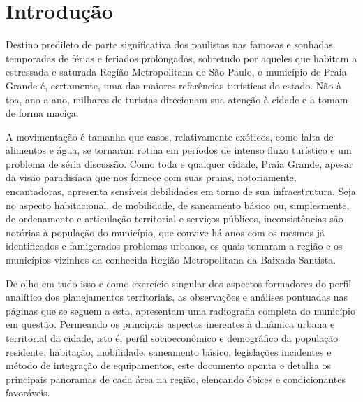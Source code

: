 	\tableofcontents 
	\newpage \listoffigures
	\newpage \listoftables
	\textual


%
%

%
%
	
	\chapter{Introdução}
	
	Destino predileto de parte significativa dos paulistas nas famosas e sonhadas temporadas de férias e feriados prolongados, sobretudo por aqueles que habitam a estressada e saturada Região Metropolitana de São Paulo, o município de Praia Grande é, certamente, uma das maiores referências turísticas do estado. Não à toa, ano a ano, milhares de turistas direcionam sua atenção à cidade e a tomam de forma maciça.
	
	A movimentação é tamanha que casos, relativamente exóticos, como falta de alimentos e água, se tornaram rotina em períodos de intenso fluxo turístico e um problema de séria discussão. Como toda e qualquer cidade, Praia Grande, apesar da visão paradisíaca que nos fornece com suas praias, notoriamente, encantadoras, apresenta sensíveis debilidades em torno de sua infraestrutura. Seja no aspecto habitacional, de mobilidade, de saneamento básico ou, simplesmente, de ordenamento e articulação territorial e serviços públicos, inconsistências são notórias à população do município, que convive há anos com os mesmos já identificados e famigerados problemas urbanos, os quais tomaram a região e os municípios vizinhos da conhecida Região Metropolitana da Baixada Santista.
	
	De olho em tudo isso e como exercício singular dos aspectos formadores do perfil analítico dos planejamentos territoriais, as observações e análises pontuadas nas páginas que se seguem a esta, apresentam uma radiografia completa do município em questão.  Permeando os principais aspectos inerentes à dinâmica urbana e territorial da cidade, isto é, perfil socioeconômico e demográfico da população residente, habitação, mobilidade, saneamento básico, legislações incidentes e método de integração de equipamentos, este documento aponta e detalha os principais panoramas de cada área na região, elencando óbices e condicionantes favoráveis.
	
